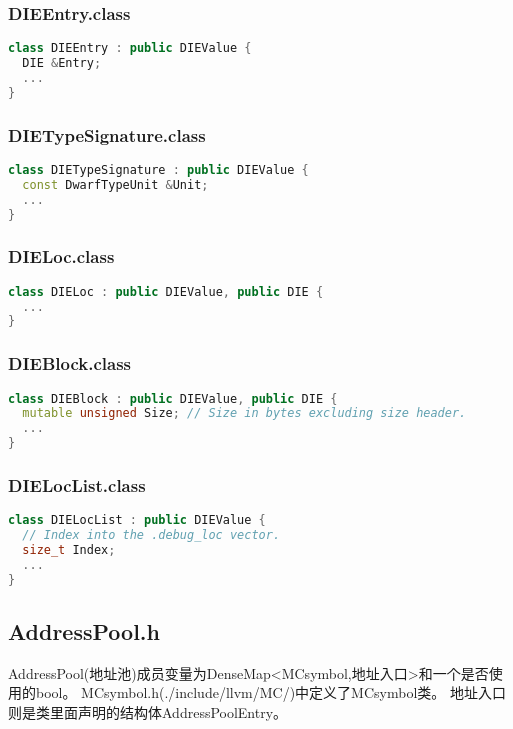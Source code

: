 \documentclass{ctexart}
\begin{document}
\subsubsection{DIEEntry.class}
\begin{lstlisting}[language=c++]
class DIEEntry : public DIEValue {
  DIE &Entry;
  ...
}
\end{lstlisting}


\subsubsection{DIETypeSignature.class}
\begin{lstlisting}[language=c++]
class DIETypeSignature : public DIEValue {
  const DwarfTypeUnit &Unit;
  ...
}
\end{lstlisting}



\subsubsection{DIELoc.class}
\begin{lstlisting}[language=c++]
class DIELoc : public DIEValue, public DIE {
  ...
}
\end{lstlisting}


\subsubsection{DIEBlock.class}
\begin{lstlisting}[language=c++]
class DIEBlock : public DIEValue, public DIE {
  mutable unsigned Size; // Size in bytes excluding size header.
  ...
}
\end{lstlisting}


\subsubsection{DIELocList.class}
\begin{lstlisting}[language=c++]
class DIELocList : public DIEValue {
  // Index into the .debug_loc vector.
  size_t Index;
  ...
}
\end{lstlisting}

\newpage





\subsection{AddressPool.h}
AddressPool(地址池)成员变量为DenseMap<MCsymbol,地址入口>和一个是否使用的bool。
MCsymbol.h(./include/llvm/MC/)中定义了MCsymbol类。
地址入口则是类里面声明的结构体AddressPoolEntry。
\end{document}
